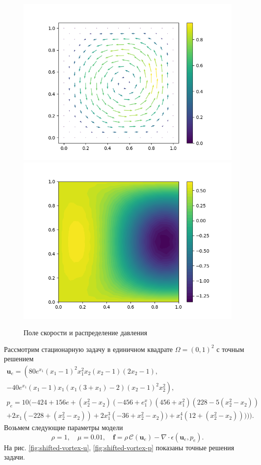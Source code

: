 \documentclass[a4paper,10pt]{report}
\begin{document}
\begin{figure}
\centering
\includegraphics[width=0.49\linewidth]{shifted-vortex/u.png}
\includegraphics[width=0.49\linewidth]{shifted-vortex/p.png}
\label{fig:shifted-vortex}
\caption{Поле скорости и распределение давления}
\end{figure}

Рассмотрим стационарную задачу в единичном квадрате $\Omega=(0,1)^2$ с точным решением
\begin{equation}
\begin{gathered}
\bm{u}_e = \left(80 e^{x_1}(x_1 - 1)^2 x_1^2 x_2 (x_2 -  1) (2 x_2 - 1),\right.\\
\left. -40 e^{x_1} (x_1 - 1) x_1 (x_1 (3 + x_1) - 2) (x_2-1)^2 x_2^2\right), \\
p_e = 10 (-424 + 156 e + (x_2^2-x_2) (-456 + e^x_1) (456 + x_1^2) (228 - 5 (x_2^2 - x_2)) \\
+ 2 x_1 (-228 + (x_2^2 - x_2)) + 2 x_1^3 (-36 + x_2^2 - x_2)) + x_1^4 (12 + (x_2^2 - x_2))))).
\end{gathered}
\label{eq:shifted-vortex}
\end{equation}
Возьмем следующие параметры модели
\[
\rho = 1, \quad \mu = 0.01, \quad \bm{f} = \rho \,\mathcal{C}(\bm{u}_e) - \nabla \cdot \epsilon(\bm{u}_e, p_e).
\]
На рис. \ref{fig:shifted-vortex-u}, \ref{fig:shifted-vortex-p} показаны точные решения задачи.
\end{document}
